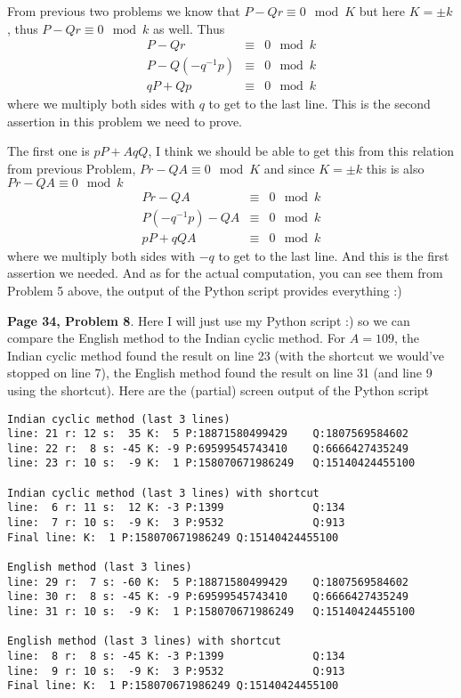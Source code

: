 \documentclass[aps,preprint,preprintnumbers,nofootinbib,showpacs,prd]{revtex4-1}
\newcommand{\nbea}{\begin{eqnarray*}}
\newcommand{\neea}{\end{eqnarray*}}
\begin{document}
From previous two problems we know that $P-Qr \equiv 0 \mod{K}$ but here $K=\pm k$, thus $P-Qr \equiv 0 \mod{k}$ as well. Thus
%
\nbea
P - Qr & \equiv & 0 \mod{k} \\
P - Q(-q^{-1}p) & \equiv & 0 \mod{k} \\
qP + Qp & \equiv & 0\mod{k}
\neea
%
where we multiply both sides with $q$ to get to the last line. This is the second assertion in this problem we need to prove.

The first one is $pP + AqQ$, I think we should be able to get this from this relation from previous Problem, $Pr - QA \equiv 0 \mod{K}$ and since $K=\pm k$ this is also $Pr - QA \equiv 0 \mod{k}$
%
\nbea
Pr - QA & \equiv & 0 \mod{k} \\
P(-q^{-1}p) - QA & \equiv & 0 \mod{k} \\
pP + qQA & \equiv & 0 \mod{k}
\neea
%
where we multiply both sides with $-q$ to get to the last line. And this is the first assertion we needed. And as for the actual computation, you can see them from Problem 5 above, the output of the Python script provides everything :)

{\bf Page 34, Problem 8}. Here I will just use my Python script :) so we can compare the English method to the Indian cyclic method. For $A = 109$, the Indian cyclic method found the result on line 23 (with the shortcut we would've stopped on line 7), the English method found the result on line 31 (and line 9 using the shortcut). Here are the (partial) screen output of the Python script
%
\begin{Verbatim}[baselinestretch=0.75]
Indian cyclic method (last 3 lines)
line: 21 r: 12 s:  35 K:  5 P:18871580499429    Q:1807569584602
line: 22 r:  8 s: -45 K: -9 P:69599545743410    Q:6666427435249
line: 23 r: 10 s:  -9 K:  1 P:158070671986249   Q:15140424455100

Indian cyclic method (last 3 lines) with shortcut
line:  6 r: 11 s:  12 K: -3 P:1399              Q:134        
line:  7 r: 10 s:  -9 K:  3 P:9532              Q:913        
Final line: K:  1 P:158070671986249 Q:15140424455100

English method (last 3 lines)
line: 29 r:  7 s: -60 K:  5 P:18871580499429    Q:1807569584602
line: 30 r:  8 s: -45 K: -9 P:69599545743410    Q:6666427435249
line: 31 r: 10 s:  -9 K:  1 P:158070671986249   Q:15140424455100

English method (last 3 lines) with shortcut
line:  8 r:  8 s: -45 K: -3 P:1399              Q:134        
line:  9 r: 10 s:  -9 K:  3 P:9532              Q:913        
Final line: K:  1 P:158070671986249 Q:15140424455100
\end{Verbatim}
%
\end{document}
